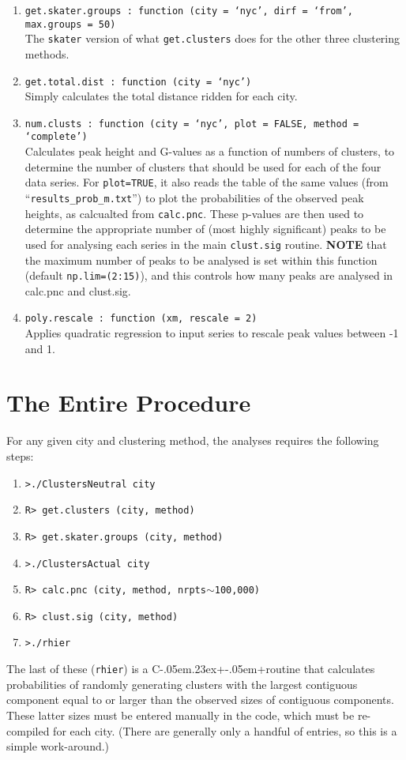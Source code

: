\documentclass[a4paper,oneside]{article}
\def\CPP{{C\kern-.05em\raise.23ex\hbox{+\kern-.05em+}\hspace{4pt}}}
\begin{document}
\begin{enumerate}
    \item {\tt get.skater.groups : function (city = `nyc', dirf = `from', max.groups = 50)}\\
        The {\tt skater} version of what {\tt get.clusters} does for the other three clustering methods.
    \item {\tt get.total.dist : function (city = `nyc')}\\
        Simply calculates the total distance ridden for each city.
    \item {\tt num.clusts : function (city = `nyc', plot = FALSE, method = `complete')}\\
        Calculates peak height and G-values as a function of numbers of clusters, to determine the number of clusters that should be used for
        each of the four data series. For {\tt plot=TRUE}, it also reads the table of the same values (from ``{\tt results\_prob\_m.txt}'') to plot
        the probabilities of the observed peak heights, as calcualted from {\tt calc.pnc}.  These p-values are then used to determine the
        appropriate number of (most highly significant) peaks to be used for analysing each series in the main {\tt clust.sig} routine.  
        {\bf NOTE} that the maximum number of peaks to be analysed is set within this function (default {\tt np.lim=(2:15)}), and this controls
        how many peaks are analysed in calc.pnc and clust.sig.
    \item {\tt poly.rescale : function (xm, rescale = 2)}\\
        Applies quadratic regression to input series to rescale peak values between -1 and 1.
\end{enumerate}
\pagebreak


\section{The Entire Procedure}

For any given city and clustering method, the analyses requires the following steps:
\begin{enumerate}
    \item {\tt >./ClustersNeutral city}
    \item {\tt R> get.clusters (city, method)}
    \item {\tt R> get.skater.groups (city, method)}
    \item {\tt >./ClustersActual city}
    \item {\tt R> calc.pnc (city, method, nrpts$\sim$100,000)}
    \item {\tt R> clust.sig (city, method)}
    \item {\tt >./rhier}
\end{enumerate}
The last of these ({\tt rhier}) is a \CPP routine that calculates probabilities of randomly generating clusters with the largest contiguous
component equal to or larger than the observed sizes of contiguous components. These latter sizes must be entered manually in the code, which
must be re-compiled for each city. (There are generally only a handful of entries, so this is a simple work-around.)
\end{document}
